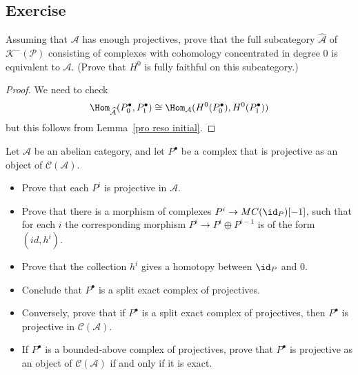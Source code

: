 \subsection{Exercise}
\begin{exercise}
Assuming that $\mathcal{A}$ has enough projectives, prove that the full subcategory $\widehat{\mathcal{A}}$ of $\mathcal{K}^-(\mathcal{P})$ consisting of complexes with cohomology concentrated in degree $0$ is equivalent to $\mathcal{A}$. (Prove that $H^0$ is fully faithful on this subcategory.)
\end{exercise}
\begin{proof}
We need to check
\[\Hom_{\widehat{\mathcal{A}}}(P_0^\bullet,P_1^\bullet)\cong\Hom_{\mathcal{A}}(H^0(P_0^\bullet),H^0(P_1^\bullet))\]
but this follows from Lemma~\ref{pro reso initial}.
\end{proof}
\begin{exercise}
Let $\mathcal{A}$ be an abelian category, and let $P^\bullet$ be a complex that is projective as an object of $\mathcal{C}(\mathcal{A})$.
\begin{itemize}
\item Prove that each $P^i$ is projective in $\mathcal{A}$.
\item Prove that there is a morphism of complexes $P^i\to MC(\id_P)[-1]$, such that for each $i$ the corresponding morphism $P^i\to P^i\oplus P^{i-1}$ is of the form $(id,h^i)$.
\item Prove that the collection $h^i$ gives a homotopy between $\id_P$ and $0$.
\item Conclude that $P^\bullet$ is a split exact complex of projectives.
\item Conversely, prove that if $P^\bullet$ is a split exact complex of projectives, then $P^\bullet$
is projective in $\mathcal{C}(\mathcal{A})$.
\item If $P^\bullet$ is a bounded-above complex of projectives, prove that $P^\bullet$ is projective as
an object of $\mathcal{C}(\mathcal{A})$ if and only if it is exact.
\end{itemize}
\end{exercise}
